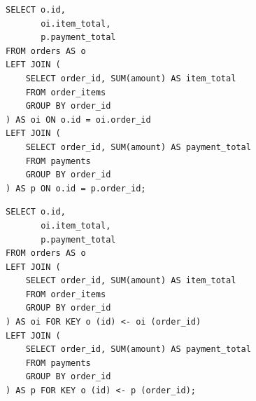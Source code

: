\documentclass[12pt]{article}
\newcommand{\FanoutCheckHeight}[3]{%
  \ifdim\dimexpr\ht#1+\dp#1\relax>#2\relax
    \PackageError{fanout-layout}{#3 exceeds its vertical allocation}%
      {Adjust the terminal line spacing or the box position.}%
  \fi
}
\begin{document}
\begin{lrbox}{\groupedFanoutOn}\begin{minipage}{344mm}
\begin{lstlisting}[style=rewrite-sql]
SELECT o.id,
       oi.item_total,
       p.payment_total
FROM orders AS o
LEFT JOIN (
    SELECT order_id, SUM(amount) AS item_total
    FROM order_items
    GROUP BY order_id
) AS oi ON o.id = oi.order_id
LEFT JOIN (
    SELECT order_id, SUM(amount) AS payment_total
    FROM payments
    GROUP BY order_id
) AS p ON o.id = p.order_id;
\end{lstlisting}
\end{minipage}\end{lrbox}
\begin{lrbox}{\groupedFanoutKey}\begin{minipage}{344mm}
\begin{lstlisting}[style=rewrite-sql]
SELECT o.id,
       oi.item_total,
       p.payment_total
FROM orders AS o
LEFT JOIN (
    SELECT order_id, SUM(amount) AS item_total
    FROM order_items
    GROUP BY order_id
) AS oi FOR KEY o (id) <- oi (order_id)
LEFT JOIN (
    SELECT order_id, SUM(amount) AS payment_total
    FROM payments
    GROUP BY order_id
) AS p FOR KEY o (id) <- p (order_id);
\end{lstlisting}
\end{minipage}\end{lrbox}
\FanoutCheckHeight{\groupedFanoutOn}{122mm}{Appendix groupedFanoutOn}
\FanoutCheckHeight{\groupedFanoutKey}{122mm}{Appendix groupedFanoutKey}
\end{document}
